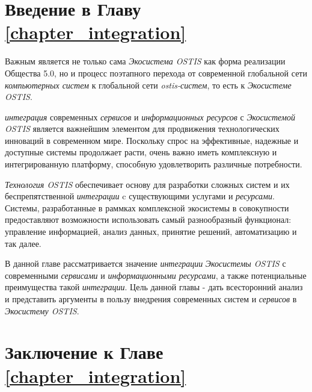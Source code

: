 \section*{Введение в Главу \ref{chapter_integration}}
Важным является не только сама \textit{Экосистема OSTIS} как форма реализации Общества 5.0, но и процесс поэтапного перехода от современной глобальной сети \textit{компьютерных систем} к глобальной сети \textit{ostis-систем}, то есть к \textit{Экосистеме OSTIS}.

\textit{интеграция} современных \textit{сервисов} и \textit{информационных ресурсов} с \textit{Экосистемой OSTIS} является важнейшим элементом для продвижения технологических инноваций в современном мире. Поскольку спрос на эффективные, надежные и доступные системы продолжает расти, очень важно иметь комплексную и интегрированную платформу, способную удовлетворить различные потребности.

\textit{Технология OSTIS} обеспечивает основу для разработки сложных систем и их беспрепятственной \textit{интеграции} c существующими услугами и \textit{ресурсами}. Системы, разработанные в раммках комплексной экосистемы в совокупности предоставляют возможности использовать самый разнообразный функционал: управление информацией, анализ данных, принятие решений, автоматизацию и так далее.

В данной главе рассматривается значение \textit{интеграции} \textit{Экосистемы OSTIS} с современными \textit{сервисами} и \textit{информационными ресурсами}, а также потенциальные преимущества такой \textit{интеграции}. 
Цель данной главы - дать всесторонний анализ и представить аргументы в пользу внедрения современных систем и \textit{сервисов} в \textit{Экосистему OSTIS}.




%
\section*{Заключение к Главе \ref{chapter_integration}}


